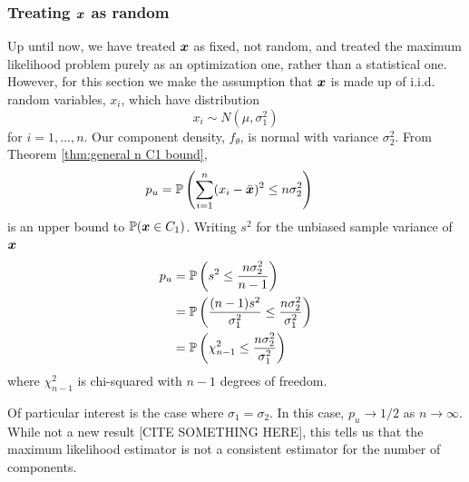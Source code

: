 	\subsubsection{Treating \texorpdfstring{${\bm{{x}}}$}{x} as random}

		Up until now, we have treated ${\bm{{x}}}$ as fixed, not random, and treated the maximum likelihood problem purely as an optimization one, rather than a statistical one. However, for this section we make the assumption that ${\bm{{x}}}$ is made up of i.i.d. random variables, $x_i$, which have distribution
		$$x_i \sim N(\mu,\sigma_1^2)$$
		for $i = 1,\dots,n$. Our component density, $f_\theta$, is normal with variance $\sigma_2^2$. From Theorem \ref{thm:general n C1 bound},
		\begin{align*}
		p_u &= \mathbb{P} \left( \sum_{i=1}^n (x_i - \bar{{\bm{{x}}}})^2 \leq n \sigma_2^2  \right)
		\end{align*}
		is an upper bound to $\mathbb{P}({\bm{{x}}} \in C_1)$. Writing $s^2$ for the unbiased sample variance of ${\bm{{x}}}$
		\begin{align*}
		p_u 
		&= \mathbb{P}\left( s^2 \leq \frac{n \sigma_2^2}{n-1}\right)\\
		&= \mathbb{P}\left( \frac{(n-1)s^2}{\sigma_1^2} \leq \frac{n \sigma_2^2}{\sigma_1^2}\right)\\
		&= \mathbb{P}\left(\chi_{n-1}^2  \leq \frac{n \sigma_2^2}{\sigma_1^2} \right)
		\end{align*}
		where $\chi_{n-1}^2$ is chi-squared with $n-1$ degrees of freedom.

		\begin{remark}
			Of particular interest is the case where $\sigma_1 = \sigma_2$. In this case, $p_u \rightarrow 1/2$ as $n \rightarrow \infty$. While not a new result [CITE SOMETHING HERE], this tells us that the maximum likelihood estimator is not a consistent estimator for the number of components.
		\end{remark}



